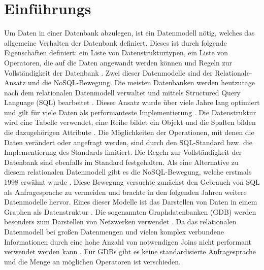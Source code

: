 
\chapter{Einführungs} %

\label{Kaptiel1} %


\newcommand{\keyword}[1]{\textit{#1}}
\newcommand{\tabhead}[1]{\textbf{#1}}
\newcommand{\code}[1]{\texttt{#1}}
\newcommand{\file}[1]{\texttt{\bfseries#1}}
\newcommand{\option}[1]{\texttt{\itshape#1}}

Um Daten in einer Datenbank abzulegen, ist ein Datenmodell nötig, welches  das allgemeine Verhalten der Datenbank definiert. Dieses ist durch folgende Eigenschaften definiert: ein Liste von Datenstrukturtypen, ein Liste von Operatoren, die auf die Daten angewandt werden können und Regeln zur Vollständigkeit der Datenbank \parencite{codd1981data}. Zwei dieser Datenmodelle sind der Relationale-Ansatz und die NoSQL-Bewegung. Die meisten Datenbanken werden heutzutage nach dem relationalen Datenmodell verwaltet und mittels Structured Query Language (SQL) bearbeitet \parencite{miller2013graph}. Dieser Ansatz wurde über viele Jahre lang optimiert und gilt für viele Daten als performanteste Implementierung \parencite{miller2013graph}. Die Datenstruktur wird eine Tabelle verwendet, eine Reihe bildet ein Objekt und die Spalten bilden die dazugehörigen Attribute \parencite{miller2013graph}. Die Möglichkeiten der Operationen, mit denen die Daten verändert oder angefragt werden, sind durch den SQL-Standard bzw. die Implementierung des  Standards limitiert. Die Regeln zur Vollständigkeit der Datenbank sind ebenfalls im Standard festgehalten. \newline 
Als eine Alternative zu diesem relationalen Datenmodell gibt es die NoSQL-Bewegung, welche erstmals 1998 erwähnt wurde \parencite{strauch2011nosql}. Diese Bewegung versuchte zunächst den Gebrauch von SQL als Anfragesprache zu vermeiden und brachte in den folgenden Jahren weitere Datenmodelle hervor. Eines dieser Modelle ist das Darstellen von Daten in einem Graphen als Datenstruktur \parencite{miller2013graph}. Die sogenannten Graphdatenbanken (GDB) werden besonders zum Darstellen von Netzwerken verwendet \parencite{han2011survey}. Da das relationalen Datenmodell bei großen Datenmengen und vielen komplex verbundene Informationen durch eine hohe Anzahl von notwendigen Joins nicht performant verwendet werden kann \parencite{miller2013graph}. Für GDBs gibt es keine standardisierte Anfragesprache und  die Menge an möglichen Operatoren ist verschieden.  \newline
